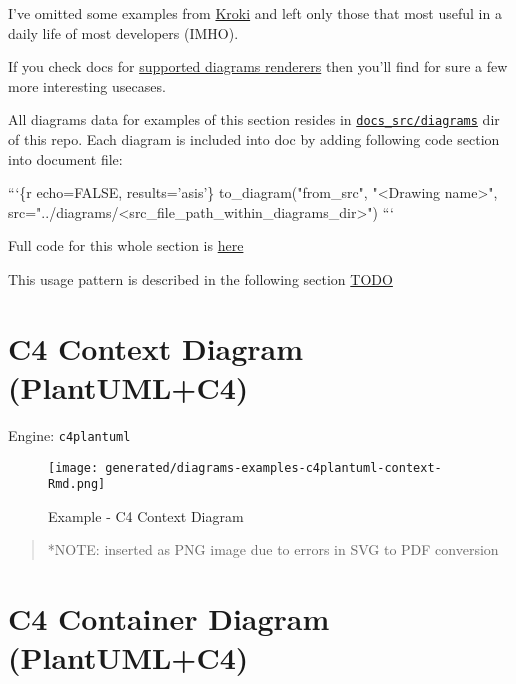 \documentclass[12pt,a4paper,12pt,oneside,openany]{book}
\newenvironment{Shaded}{\begin{snugshade}}{\end{snugshade}}
\newcommand{\DataTypeTok}[1]{\textcolor[rgb]{0.27,0.27,0.27}{#1}}
\newcommand{\StringTok}[1]{\textcolor[rgb]{0.5,0.5,0.5}{#1}}
\begin{document}
I've omitted some examples from \href{https://kroki.io/examples.html}{Kroki} and left only those that most useful in a daily life of most developers (IMHO).

If you check docs for \href{https://kroki.io/\#support}{supported diagrams renderers} then you'll find for sure a few more interesting usecases.

All diagrams data for examples of this section resides in \href{https://github.com/Godhart/devdoc-swissknife/tree/main/docs_src/diagrams/examples}{\texttt{docs\_src/diagrams}} dir of this repo. Each diagram is included into doc by adding following code section into document file:

\begin{Shaded}
\begin{Highlighting}[]
\StringTok{```}\DataTypeTok{\{r echo=FALSE, results='asis'\}}
\DataTypeTok{  to_diagram("from_src", "<Drawing name>", src="../diagrams/<src_file_path_within_diagrams_dir>")}
\StringTok{```}
\end{Highlighting}
\end{Shaded}

Full code for this whole section is \href{https://github.com/Godhart/devdoc-swissknife/blob/main/docs_src/devdoc-swissknife-en/03-KrokiExamples.Rmd}{here}

This usage pattern is described in the following section \protect\hyperlink{TODO}{TODO}

\newpage

\section{C4 Context Diagram (PlantUML+C4)}\label{c4-context-diagram-plantumlc4}

Engine: \texttt{c4plantuml}

\begin{figure}
\centering
\texttt{[image: generated/diagrams-examples-c4plantuml-context-Rmd.png]}
\caption{Example - C4 Context Diagram}
\end{figure}

\begin{quote}
*NOTE: inserted as PNG image due to errors in SVG to PDF conversion
\end{quote}

\newpage

\section{C4 Container Diagram (PlantUML+C4)}\label{c4-container-diagram-plantumlc4}
\end{document}

